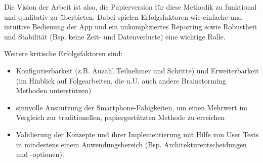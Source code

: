Die Vision der Arbeit ist also, die Papierversion für diese Methodik zu funktional und qualitativ zu überbieten. Dabei spielen Erfolgsfaktoren wie einfache und intuitive Bedienung der App und ein unkompliziertes Reporting sowie Robustheit und Stabilität (Bsp. keine Zeit- und Datenverluste) eine wichtige Rolle.

Weitere kritische Erfolgsfaktoren sind:
\begin{itemize}
  \item Konfigurierbarkeit (z.B. Anzahl Teilnehmer und Schritte)  und Erweiterbarkeit (im Hinblick auf Folgearbeiten, die u.U. auch andere Brainstorming Methoden unterstützen)
  \item sinnvolle Ausnutzung der Smartphone-Fähigkeiten, um einen Mehrwert im Vergleich zur traditionellen, papiergestützten Methode zu erreichen
  \item Validierung der Konzepte und ihrer Implementierung mit Hilfe von User Tests in mindestens einem Anwendungsbereich (Bsp. Architekturentscheidungen und -optionen).
\end{itemize}


\thispagestyle{empty}
